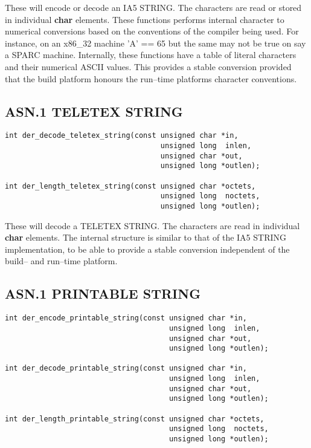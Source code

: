 \documentclass[synpaper]{book}
\begin{document}
These will encode or decode an IA5 STRING.  The characters are read or stored in individual \textbf{char} elements.  These functions performs internal character
to numerical conversions based on the conventions of the compiler being used.  For instance, on an x86\_32 machine 'A' == 65 but the same may not be true on
say a SPARC machine.  Internally, these functions have a table of literal characters and their numerical ASCII values.  This provides a stable conversion provided
that the build platform honours the run--time platforms character conventions.

\subsection{ASN.1 TELETEX STRING}

\begin{verbatim}
int der_decode_teletex_string(const unsigned char *in,
                                    unsigned long  inlen,
                                    unsigned char *out,
                                    unsigned long *outlen);

int der_length_teletex_string(const unsigned char *octets,
                                    unsigned long  noctets,
                                    unsigned long *outlen);
\end{verbatim}

These will decode a TELETEX STRING.
The characters are read in individual \textbf{char} elements.
The internal structure is similar to that of the IA5 STRING implementation, to
be able to provide a stable conversion independent of the build-- and run--time
platform.

\subsection{ASN.1 PRINTABLE STRING}

\begin{verbatim}
int der_encode_printable_string(const unsigned char *in,
                                      unsigned long  inlen,
                                      unsigned char *out,
                                      unsigned long *outlen);

int der_decode_printable_string(const unsigned char *in,
                                      unsigned long  inlen,
                                      unsigned char *out,
                                      unsigned long *outlen);

int der_length_printable_string(const unsigned char *octets,
                                      unsigned long  noctets,
                                      unsigned long *outlen);
\end{verbatim}
\end{document}
